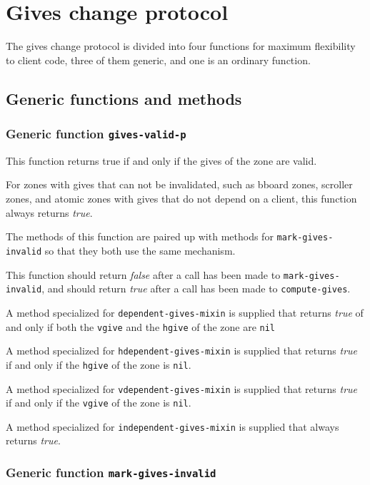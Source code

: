 \documentclass{report}
\begin{document}
\section{Gives change protocol}

The gives change protocol is divided into four functions for maximum
flexibility to client code, three of them generic, and one is an
ordinary function.

\subsection{Generic functions and methods}

\subsubsection{Generic function \texttt{gives-valid-p}}
\label{generic-function-gives-valid-p}

This function returns true if and only if the gives of the zone are
valid.  

For zones with gives that can not be invalidated, such as bboard
zones, scroller zones, and atomic zones with gives that do not depend
on a client, this function always returns \emph{true}.

The methods of this function are paired up with methods for
\texttt{mark-gives-invalid} so that they both use the same mechanism. 

This function should return \emph{false} after a call has been made to
\texttt{mark-gives-invalid}, and should return \emph{true} after a
call has been made to \texttt{compute-gives}.  

A method specialized for \texttt{dependent-gives-mixin} is supplied
that returns \emph{true} of and only if both the \texttt{vgive} and
the \texttt{hgive} of the zone are \texttt{nil}

A method specialized for \texttt{hdependent-gives-mixin} is supplied
that returns \emph{true} if and only if the \texttt{hgive} of the zone
is \texttt{nil}.

A method specialized for \texttt{vdependent-gives-mixin} is supplied
that returns \emph{true} if and only if the \texttt{vgive} of the zone
is \texttt{nil}.

A method specialized for \texttt{independent-gives-mixin} is supplied
that always returns \emph{true}. 

\subsubsection{Generic function \texttt{mark-gives-invalid}}
\label{generic-function-mark-gives-invalid}
\end{document}
